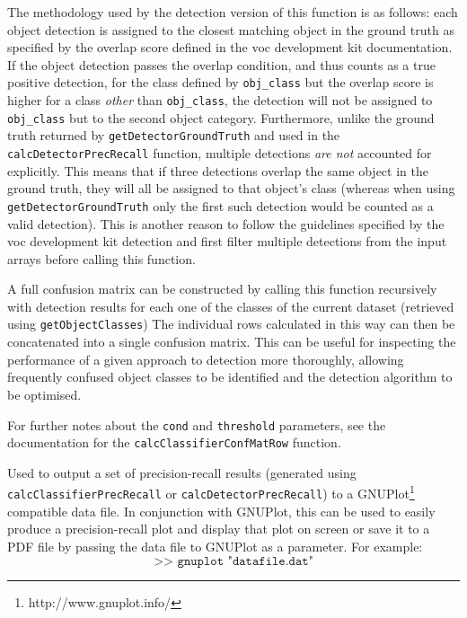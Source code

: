 The methodology used by the detection version of this function is as follows: each object detection is assigned to the closest matching object in the ground truth as specified by the overlap score defined in the voc development kit documentation. If the object detection passes the overlap condition, and thus counts as a true positive detection, for the class defined by \texttt{obj\_class} but the overlap score is higher for a class \emph{other} than \texttt{obj\_class}, the detection will not be assigned to \texttt{obj\_class} but to the second object category. Furthermore, unlike the ground truth returned by \texttt{getDetectorGroundTruth} and used in the \texttt{calcDetectorPrecRecall} function, multiple detections \emph{are not} accounted for explicitly. This means that if three detections overlap the same object in the ground truth, they will all be assigned to that object's class (whereas when using \texttt{getDetectorGroundTruth} only the first such detection would be counted as a valid detection). This is another reason to follow the guidelines specified by the voc development kit detection and first filter multiple detections from the input arrays before calling this function.

A full confusion matrix can be constructed by calling this function recursively with detection results for each one of the classes of the current dataset (retrieved using \texttt{getObjectClasses}) The individual rows calculated in this way can then be concatenated into a single confusion matrix. This can be useful for inspecting the performance of a given approach to detection more thoroughly, allowing frequently confused object classes to be identified and the detection algorithm to be optimised.

For further notes about the \texttt{cond} and \texttt{threshold} parameters, see the documentation for the \texttt{calcClassifierConfMatRow} function.


Used to output a set of precision-recall results (generated using \texttt{calcClassifierPrecRecall} or \texttt{calcDetectorPrecRecall}) to a GNUPlot\footnote{http://www.gnuplot.info/} compatible data file. In conjunction with GNUPlot, this can be used to easily produce a precision-recall plot and display that plot on screen or save it to a PDF file by passing the data file to GNUPlot as a parameter. For example:
\[
\texttt{>> gnuplot "datafile.dat"}
\]

